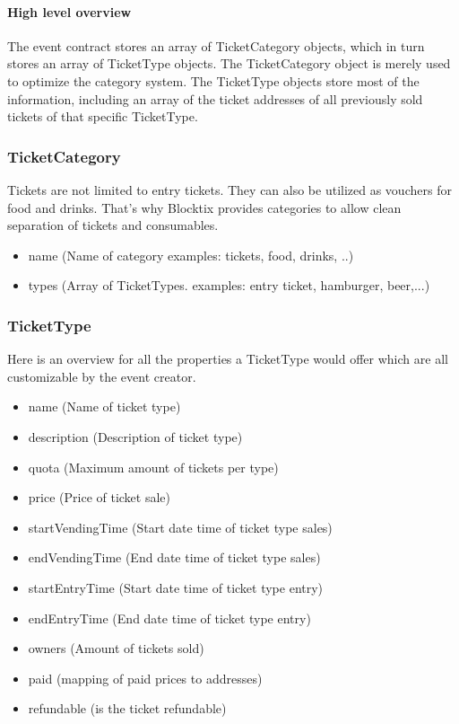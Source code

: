 \documentclass[a4paper]{article}
\begin{document}
\paragraph{High level overview}
The event contract stores an array of TicketCategory objects, which in turn stores an array of TicketType objects. The TicketCategory object is merely used to optimize the category system. The TicketType objects store most of the information, including an array of the ticket addresses of all previously sold tickets of that specific TicketType. 

\subsubsection{TicketCategory} Tickets are not limited to entry tickets. They can also be utilized as vouchers for food and drinks. That's why Blocktix provides categories to allow clean separation of tickets and consumables. 
\begin{itemize}
\item name (Name of category examples: tickets, food, drinks, ..)
\item types (Array of TicketTypes. examples: entry ticket, hamburger, beer,...)
\end{itemize}

\subsubsection{TicketType}
Here is an overview for all the properties a TicketType would offer which are all customizable by the event creator.
\begin{itemize}
\item name (Name of ticket type)
\item description (Description of ticket type)
\item quota (Maximum amount of tickets per type)
\item price (Price of ticket sale)
\item startVendingTime (Start date time of ticket type sales)
\item endVendingTime (End date time of ticket type sales)
\item startEntryTime (Start date time of ticket type entry)
\item endEntryTime (End date time of ticket type entry)
\item owners (Amount of tickets sold)
\item paid (mapping of paid prices to addresses)
\item refundable (is the ticket refundable)
\end{itemize}
\end{document}
